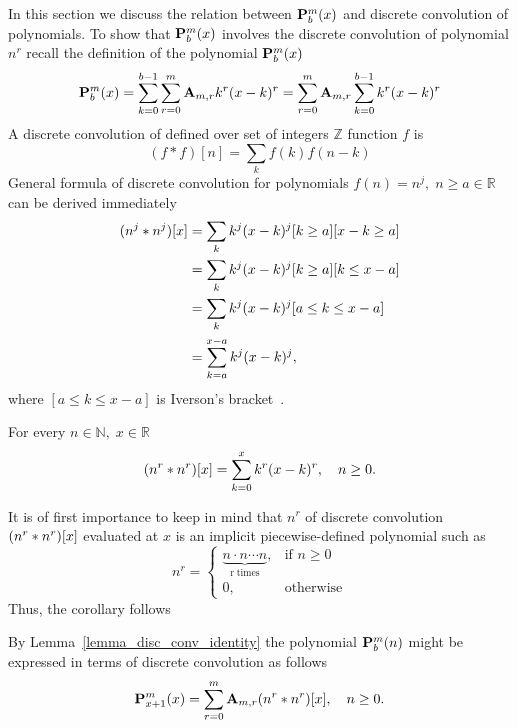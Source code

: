 In this section we discuss the relation between ${\mathbf{P}}\sp{m} \sb{b}(x)$ and discrete convolution of
polynomials.
To show that ${\mathbf{P}}\sp{m} \sb{b}(x)$ involves the discrete convolution of polynomial $n^r$
recall the definition of the polynomial ${\mathbf{P}}\sp{m} \sb{b}(x)$
\begin{equation*}
    {\mathbf{P}}\sp{m} \sb{b}(x) = \sum_{k=0}^{b-1} \sum_{r=0}^{m} {\mathbf{A}} \sb{m,r} k^r (x-k)^r
    = \sum_{r=0}^{m} {\mathbf{A}} \sb{m,r} \sum_{k=0}^{b-1} k^r (x-k)^r
\end{equation*}
A discrete convolution of defined over set of integers $\mathbb{Z}$ function $f$ is
\begin{equation*}
(f \ast f)[n]
    = \sum_{k} f(k) f(n-k)
\end{equation*}
General formula of discrete convolution for polynomials $f(n) = n^j, \; n\geq a \in \mathbb{R}$
can be derived immediately
\begin{equation*}
    \begin{split}
        (n \sp{j} \ast n \sp{j}) [x]
        &=\sum_{k} k^j (x-k)^j [k\geq a][x-k\geq a] \\
        &=\sum_{k} k^j (x-k)^j [k\geq a][k\leq x-a] \\
        &=\sum_{k} k^j (x-k)^j [a \leq k \leq x-a] \\
        &=\sum_{k=a}^{x-a} k^j (x-k)^j,
    \end{split}
\end{equation*}
where $[a \leq k \leq x-a]$ is Iverson's bracket~\cite{iverson_apl, knuth_two_notes_on_notation}.
\begin{lem}
    \label{lemma_disc_conv_identity}
    For every $n\in\mathbb{N}, \; x\in\mathbb{R}$
    \[
        (n \sp{r} \ast n \sp{r}) [x] = \sum_{k=0}^{x} k^r (x-k)^r, \quad n\geq 0.
    \]
\end{lem}
It is of first importance to keep in mind that  $n^r$ of discrete convolution $(n \sp{r} \ast n \sp{r}) [x]$ evaluated at $x$
is an implicit piecewise-defined polynomial such as
\begin{equation*}
    n^{r} =
    \begin{cases}
        \underbrace{n \cdot n \cdots n}_{\mathrm{r \; times}}, & \mbox{if } n \geq 0 \\
        0, & \mbox{otherwise}
    \end{cases}
\end{equation*}
Thus, the corollary follows
\begin{cor}
    \label{cor_polynomial_p_and_macaulay_convolution}
    By Lemma~\ref{lemma_disc_conv_identity} the polynomial ${\mathbf{P}}\sp{m} \sb{b}(n)$ might be expressed in terms
    of discrete convolution as follows
    \[
        {\mathbf{P}}\sp{m} \sb{x+1}(x) = \sum_{r=0}^{m} {\mathbf{A}} \sb{m,r} (n \sp{r} \ast n \sp{r}) [x], \quad n\geq 0.
    \]
\end{cor}
